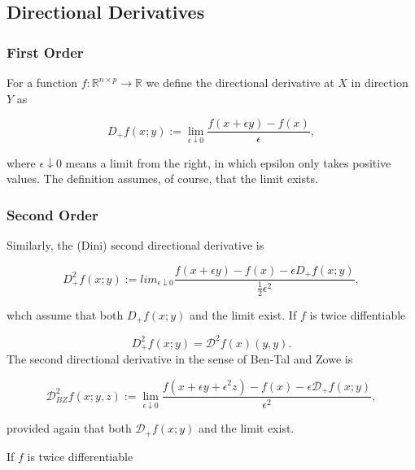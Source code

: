 \documentclass[
  12pt,
]{book}
\theoremstyle{definition}
\theoremstyle{definition}
\theoremstyle{definition}
\theoremstyle{definition}
\theoremstyle{remark}
\begin{document}
\hypertarget{apdirder}{%
\subsection{Directional Derivatives}\label{apdirder}}

\hypertarget{first-order}{%
\subsubsection{First Order}\label{first-order}}

For a function \(f:\mathbb{R}^{n\times p}\rightarrow\mathbb{R}\) we define
the directional derivative at \(X\) in direction \(Y\) as

\begin{equation}
D_+f(x;y):=\lim_{\epsilon\downarrow 0}\frac{f(x+\epsilon y)-f(x)}{\epsilon},
\label{eq:dirdevdef}
\end{equation}

where \(\epsilon\downarrow 0\) means a limit from the right, in which epsilon only takes positive values. The definition assumes, of course, that the limit exists.

\hypertarget{second-order}{%
\subsubsection{Second Order}\label{second-order}}

Similarly, the (Dini) second directional derivative is

\begin{equation}
D_+^2f(x;y):=lim_{\epsilon\downarrow 0}\frac{f(x+\epsilon y)-f(x)-\epsilon D_+f(x;y)}{\frac12\epsilon^2},
\label{eq:twodirdev}
\end{equation}

whch assume that both \(D_+f(x;y)\) and the limit exist. If \(f\) is twice
diffentiable

\[
D_+^2f(x;y)=\mathcal{D}^2f(x)(y,y).
\]
The second directional derivative in the sense of Ben-Tal and Zowe is

\begin{equation}
\mathcal{D}_{BZ}^2f(x;y,z):=\lim_{\epsilon\downarrow 0}\frac{f(x+\epsilon y+\epsilon^2 z)-f(x)-\epsilon\mathcal{D}_+f(x;y)}{\epsilon^2},
\label{eq:apbtzdef}
\end{equation}

provided again that both \(\mathcal{D}_+f(x;y)\) and the limit exist.

If \(f\) is twice differentiable
\end{document}
